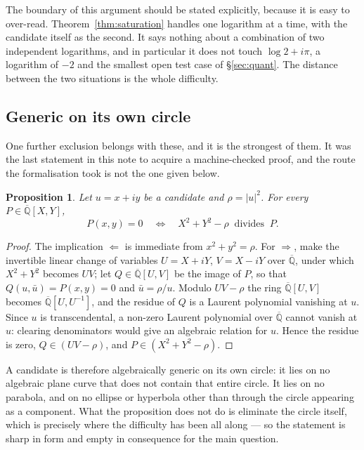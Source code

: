 \documentclass[11pt,a4paper]{article}
\theoremstyle{plain}
\newtheorem{proposition}[theorem]{Proposition}
\theoremstyle{definition}
\newcommand{\Alg}{\overline{\mathbb{Q}}}
\begin{document}
The boundary of this argument should be stated explicitly, because it is easy to over-read.
Theorem~\ref{thm:saturation} handles one logarithm at a time, with the candidate itself as the
second. It says nothing about a combination of two independent logarithms, and in particular it
does not touch $\log2+i\pi$, a logarithm of $-2$ and the smallest open test case of
\S\ref{sec:quant}. The distance between the two situations is the whole difficulty.

\subsection*{Generic on its own circle}

One further exclusion belongs with these, and it is the strongest of them. It was the last
statement in this note to acquire a machine-checked proof, and the route the formalisation took
is not the one given below.

\begin{proposition}\label{prop:kernel}
Let $u=x+iy$ be a candidate and $\rho=|u|^{2}$. For every $P\in\Alg[X,Y]$,
\[
  P(x,y)=0 \quad\Longleftrightarrow\quad X^{2}+Y^{2}-\rho \ \text{ divides } \ P .
\]
\end{proposition}

\begin{proof}
The implication $\Leftarrow$ is immediate from $x^{2}+y^{2}=\rho$. For $\Rightarrow$, make the
invertible linear change of variables $U=X+iY$, $V=X-iY$ over $\Alg$, under which $X^{2}+Y^{2}$
becomes $UV$; let $Q\in\Alg[U,V]$ be the image of $P$, so that $Q(u,\bar u)=P(x,y)=0$ and
$\bar u=\rho/u$. Modulo $UV-\rho$ the ring $\Alg[U,V]$ becomes $\Alg[U,U^{-1}]$, and the residue
of $Q$ is a Laurent polynomial vanishing at $u$. Since $u$ is transcendental, a non-zero Laurent
polynomial over $\Alg$ cannot vanish at $u$: clearing denominators would give an algebraic
relation for $u$. Hence the residue is zero, $Q\in(UV-\rho)$, and $P\in(X^{2}+Y^{2}-\rho)$.
\end{proof}

A candidate is therefore algebraically generic on its own circle: it lies on no algebraic plane
curve that does not contain that entire circle. It lies on no parabola, and on no ellipse or
hyperbola other than through the circle appearing as a component. What the proposition does not
do is eliminate the circle itself, which is precisely where the difficulty has been all along ---
so the statement is sharp in form and empty in consequence for the main question.
\end{document}

